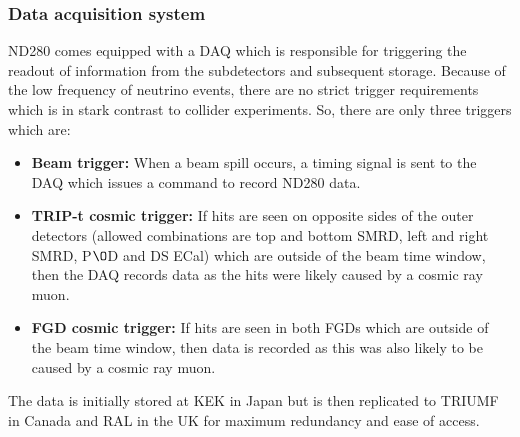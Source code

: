\subsubsection{Data acquisition system}
\label{subsubsec:DAQ}
ND280 comes equipped with a DAQ which is responsible for triggering the readout of information from the subdetectors and subsequent storage.  Because of the low frequency of neutrino events, there are no strict trigger requirements which is in stark contrast to collider experiments.  So, there are only three triggers which are:
\begin{itemize}
\item \textbf{Beam trigger:} When a beam spill occurs, a timing signal is sent to the DAQ which issues a command to record ND280 data. 
\item \textbf{TRIP-t cosmic trigger:} If hits are seen on opposite sides of the outer detectors (allowed combinations are top and bottom SMRD, left and right SMRD, P$\O$D and DS ECal) which are outside of the beam time window, then the DAQ records data as the hits were likely caused by a cosmic ray muon.
\item \textbf{FGD cosmic trigger:} If hits are seen in both FGDs which are outside of the beam time window, then data is recorded as this was also likely to be caused by a cosmic ray muon.
\end{itemize}
The data is initially stored at KEK in Japan but is then replicated to TRIUMF in Canada and RAL in the UK for maximum redundancy and ease of access.

